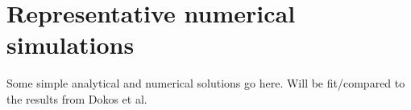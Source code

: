 \section{Representative numerical simulations}
\label{numerical-simulations}

Some simple analytical and numerical solutions go here. Will be
fit/compared to the results from Dokos et al.

%

